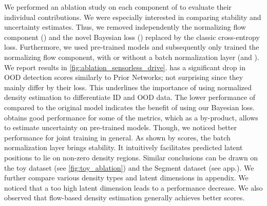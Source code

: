 We performed an ablation study on each component of \PostNetacro to evaluate their individual contributions. We were especially interested in comparing stability and uncertainty estimates. Thus, we removed independently the normalizing flow component (\NoFlow) and the novel Bayesian loss (\NoUCE) replaced by the classic cross-entropy loss. Furthermore, we used pre-trained models and subsequently only trained the normalizing flow component, with or without a batch normalization layer (\SeqBn and \SeqNoBn). We report results in \cref{fig:ablation_sensorless_drive}. \NoFlow has a significant drop in OOD detection scores similarly to Prior Networks; not surprising since they mainly differ by their loss. This underlines the importance of using normalized density estimation to differentiate ID and OOD data. The lower performance of \NoUCE compared to the original model indicates the benefit of using our Bayesian loss.
 \SeqBn obtains good performance for some of the metrics, which as a by-product, allows to estimate uncertainty on pre-trained models. Though, we noticed better performance for joint training in general. As shown by \SeqNoBn scores, the batch normalization layer brings stability. It intuitively facilitates predicted latent positions to lie on non-zero density regions. Similar conclusions can be drawn on the toy dataset (see \cref{fig:toy_ablation}) and the Segment dataset (see app.). We further compare various density types and latent dimensions in appendix. We noticed that a too high latent dimension leads to a performance decrease. We also observed that flow-based density estimation generally achieves better scores.

